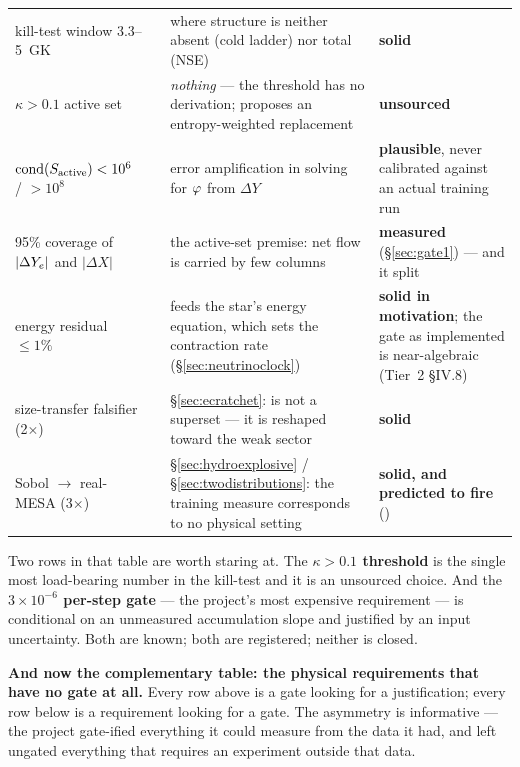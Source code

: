 \begin{longtable}{@{}L{2.7cm} L{2.2cm} L{6.6cm} L{3.3cm}@{}}
kill-test window 3.3--5~GK & &
  where structure is neither absent (cold ladder) nor total (NSE) &
  \textbf{solid} \\
$\kappa > 0.1$ active set & &
  \emph{nothing} --- the threshold has no derivation; 
  proposes an entropy-weighted replacement &
  \warnglyph{} \textbf{unsourced} \\
$\operatorname{cond}(S_{\mathrm{active}}) < 10^{6}$ / $> 10^{8}$ & &
  error amplification in solving for $\varphi$ from $\Delta Y$ &
  \textbf{plausible}, never calibrated against an actual training run \\
95\% coverage of $|\Delta Y_{e}|$ and $|\Delta X|$ & &
  the active-set premise: net flow is carried by few columns &
  \textbf{measured} (\S\ref{sec:gate1}) --- and it split \\
energy residual $\le 1\%$ & &
  \enuc{} feeds the star's energy equation, which sets the contraction rate
  (\S\ref{sec:neutrinoclock}) &
  \textbf{solid in motivation}; the gate as implemented is near-algebraic
  (Tier~2 \S IV.8) \\
size-transfer falsifier (2$\times$) & &
  \S\ref{sec:ecratchet}:  is not a superset --- it is reshaped toward
  the weak sector &
  \textbf{solid} \\
Sobol $\to$ real-MESA (3$\times$) & &
  \S\ref{sec:hydroexplosive} / \S\ref{sec:twodistributions}: the training
  measure corresponds to no physical setting &
  \textbf{solid, and predicted to fire} () \\
\end{longtable}
\endgroup

Two rows in that table are worth staring at. The \textbf{$\kappa > 0.1$
threshold} is the single most load-bearing number in the kill-test and it is an
unsourced choice. And the \textbf{$3 \times 10^{-6}$ per-step gate} --- the
project's most expensive requirement --- is conditional on an unmeasured
accumulation slope and justified by an input uncertainty. Both are known; both
are registered; neither is closed.

\textbf{And now the complementary table: the physical requirements that have no
gate at all.} Every row above is a gate looking for a justification; every row
below is a requirement looking for a gate. The asymmetry is informative --- the
project gate-ified everything it could measure from the data it had, and left
ungated everything that requires an experiment outside that data.

